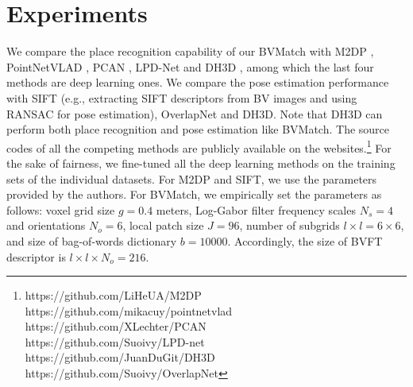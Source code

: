 \documentclass[letterpaper, 10 pt, journal, twoside]{IEEEtran}
\begin{document}
\section{Experiments}
We compare the place recognition capability of our BVMatch with M2DP \cite{he2016m2dp}, PointNetVLAD \cite{angelina2018pointnetvlad}, PCAN \cite{zhang2019pcan}, LPD-Net \cite{liu2019lpd} and DH3D \cite{du2020dh3d}, among which the last four methods are deep learning ones. We compare the pose estimation performance with SIFT \cite{2004Distinctive} (e.g., extracting SIFT descriptors from BV images and using RANSAC for pose estimation), OverlapNet \cite{chen2020overlapnet} and DH3D. Note that DH3D can perform both place recognition and pose estimation like BVMatch. The source codes of all the competing methods are publicly available on the websites.\footnote{https://github.com/LiHeUA/M2DP\\https://github.com/mikacuy/pointnetvlad\\https://github.com/XLechter/PCAN\\https://github.com/Suoivy/LPD-net\\https://github.com/JuanDuGit/DH3D\\https://github.com/Suoivy/OverlapNet} For the sake of fairness, we fine-tuned all the deep learning methods on the training sets of the individual datasets. For M2DP and SIFT, we use the parameters provided by the authors. For BVMatch, we empirically set the parameters as follows: voxel grid size $g=0.4$ meters,  Log-Gabor filter frequency scales $N_s=4$ and orientations $N_o=6$, local patch size $J=96$, number of subgrids $l\times l=6\times 6$, and size of bag-of-words dictionary $b=10000$. Accordingly, the size of BVFT descriptor is $l\times l\times N_o=216$. %
\end{document}
